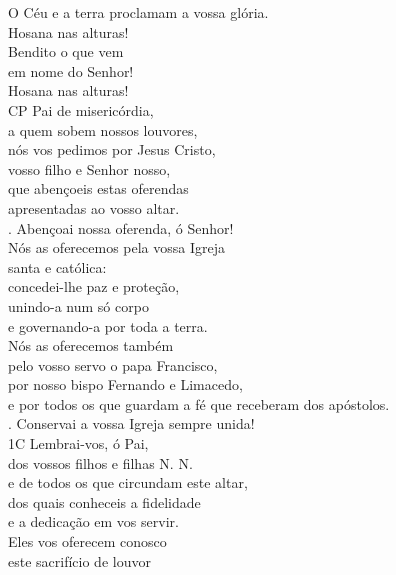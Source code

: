 \documentclass{book}
\begin{document}
\begin{flushleft}
    O Céu e a terra proclamam a vossa glória. \\
    Hosana nas alturas! \\
    Bendito o que vem \\
    em nome do Senhor! \\
    Hosana nas alturas!
    \vspace{.1cm} \\
    {\color{red}CP} Pai de misericórdia, \\
    a quem sobem nossos louvores, \\
    nós vos pedimos por Jesus Cristo, \\
    vosso filho e Senhor nosso, \\
    que abençoeis {\color{red} \grecross} estas oferendas \\
    apresentadas ao vosso altar.
    \vspace{.1cm} \\
    {\color{red} \Rbar.} Abençoai nossa oferenda, ó Senhor!
    \vspace{.1cm} \\
    Nós as oferecemos pela vossa Igreja \\
    santa e católica: \\
    concedei-lhe paz e proteção, \\
    unindo-a num só corpo \\
    e governando-a por toda a terra. \\
    Nós as oferecemos também \\
    pelo vosso servo o papa Francisco, \\
    por nosso bispo Fernando e Limacedo, \\
    e por todos os que guardam a fé que receberam dos apóstolos.
    \vspace{.1cm} \\
    {\color{red} \Rbar.} Conservai a vossa Igreja sempre unida!
    \vspace{.1cm} \\
    {\color{red}1C} Lembrai-vos, ó Pai, \\
    dos vossos filhos e filhas N. N. \\
    e de todos os que circundam este altar, \\
    dos quais conheceis a fidelidade \\
    e a dedicação em vos servir. \\
    Eles vos oferecem conosco \\
    este sacrifício de louvor \\

\end{flushleft}
\end{document}
